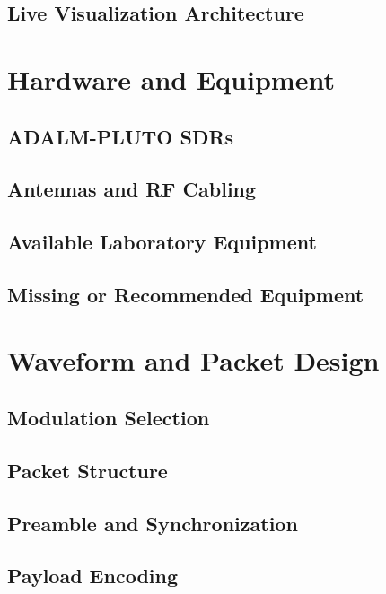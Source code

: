 \documentclass[conference]{IEEEtran}
\begin{document}
\subsection{Live Visualization Architecture}

\section{Hardware and Equipment}

\subsection{ADALM-PLUTO SDRs}

\subsection{Antennas and RF Cabling}

\subsection{Available Laboratory Equipment}

\subsection{Missing or Recommended Equipment}

\section{Waveform and Packet Design}

\subsection{Modulation Selection}

\subsection{Packet Structure}

\subsection{Preamble and Synchronization}

\subsection{Payload Encoding}
\end{document}
